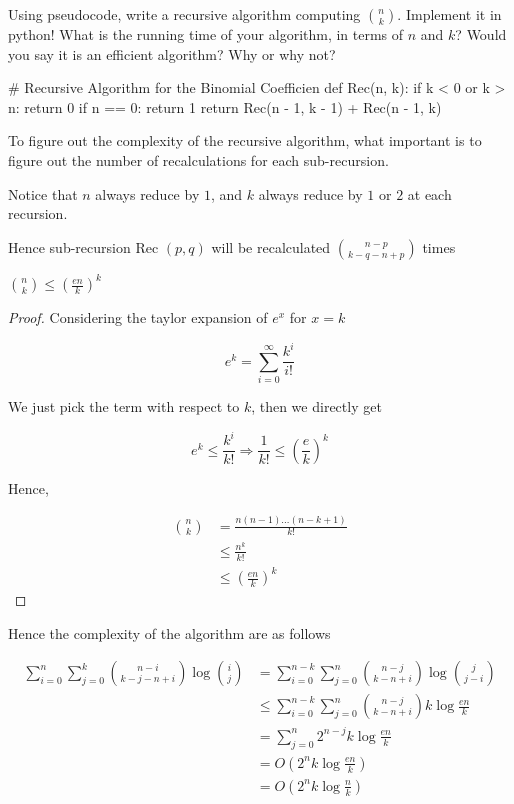 \documentclass[11pt,a4paper,oneside]{article}
\begin{document}
\begin{problem}{3} 
        Using pseudocode, write a recursive algorithm computing
        ${n \choose k}$. Implement it in python! What is 
        the running time of your algorithm, in terms of $n$ and $k$? Would you say it is an efficient
        algorithm? Why or why not?
    \solution
\begin{python}
# Recursive Algorithm for the Binomial Coefficien
def Rec(n, k):
    if k < 0 or k > n:
        return 0
    if n == 0:
	    return 1
    return Rec(n - 1, k - 1) + Rec(n - 1, k)
\end{python}
    
    To figure out the complexity of the recursive algorithm, what important is to figure out the number of recalculations for each sub-recursion.
    
    Notice that \( n \) always reduce by \( 1 \), and \( k \) always reduce by \( 1 \) or \( 2 \) at each recursion.
    
    Hence sub-recursion Rec \( (p, q) \) will be recalculated \( {n - p \choose k - q - n + p} \) times
    
	\begin{lemma}
		\({n \choose k} \leq (\frac{en}{k})^k\)
	\begin{proof}
		Considering the taylor expansion of \(e^x\) for \(x = k\)
		
		\[
			e^k = \sum_{i=0}^{\infty} \frac{k^i}{i!}
		\]
		
		We just pick the term with respect to \(k\), then we directly get 
		
		\[
			e^k \leq \frac{k^i}{k!} \Rightarrow \frac{1}{k!} \leq (\frac{e}{k})^k
		\]
		
		Hence,
		
		\[
			\begin{split}
				{n \choose k} &= \frac{n(n-1)\dots(n-k+1)}{k!} \\
				&\leq \frac{n^k}{k!} \\
				&\leq (\frac{en}{k})^k
			\end{split}
		\]
		
    \end{proof}
    \end{lemma}
    Hence the complexity of the algorithm are as follows

    \[
	    \begin{split}
		    \sum_{i = 0}^{n} \sum_{j = 0}^k {n - i \choose k - j - n + i} \log{i \choose j} &= \sum_{i=0}^{n-k} \sum_{j=0}^n {n - j \choose k - n + i} \log{j \choose j - i} \\
		    &\leq \sum_{i=0}^{n-k} \sum_{j=0}^n {n - j \choose k - n + i} k\log{\frac{en}{k}} \\
		    &= \sum_{j=0}^n 2^{n-j} k \log{\frac{en}{k}} \\
		    &= O(2^{n}k \log{\frac{en}{k}}) \\
		    &= O(2^{n}k \log{\frac{n}{k}})
	    \end{split}
    \]
\end{problem}
\end{document}
